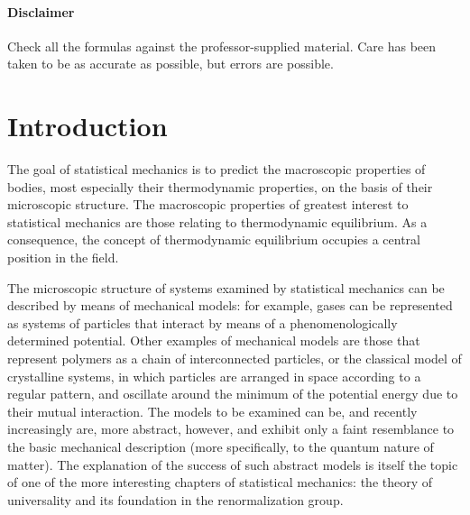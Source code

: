 \documentclass[11pt, a4paper, twoside, openright]{book}
\begin{document}

\frontmatter


\tableofcontents


\pagestyle{plain}

\subsubsection*{Disclaimer}

Check all the formulas against the professor-supplied material. Care has been taken to be as accurate as possible, but errors are possible.


\chapter{Introduction}

The goal of statistical mechanics is to predict the macroscopic properties of bodies, most especially their thermodynamic properties, on the basis of their microscopic structure.
The macroscopic properties of greatest interest to statistical mechanics are those relating to thermodynamic equilibrium. As a consequence, the concept of thermodynamic equilibrium occupies a central position in the field. 

The microscopic structure of systems examined by statistical mechanics can be described by means of mechanical models: for example, gases can be represented as systems of particles that interact by means of a phenomenologically determined potential. Other examples of mechanical models are those that represent polymers as a chain of interconnected particles, or the classical model of crystalline systems, in which particles are arranged in space according to a regular pattern, and oscillate around the minimum of the potential energy due to their mutual interaction. The models to be examined can be, and recently increasingly are, more abstract, however, and exhibit only a faint resemblance to the basic mechanical description (more specifically, to the quantum nature of matter). The explanation of the success of such abstract models is itself the topic of one of the more interesting chapters of statistical mechanics: the theory of universality and its foundation in the renormalization group.
\end{document}
